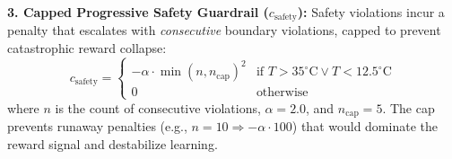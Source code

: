 \documentclass[conference]{IEEEtran}
\begin{document}
    \noindent \textbf{3. Capped Progressive Safety Guardrail ($c_{\text{safety}}$):} Safety violations incur a penalty that escalates with \emph{consecutive} boundary violations, capped to prevent catastrophic reward collapse:
    \begin{equation}
    c_{\text{safety}} = \begin{cases}
    -\alpha \cdot \min(n, n_{\text{cap}})^2 & \text{if } T > 35^{\circ}\text{C} \lor T < 12.5^{\circ}\text{C} \\
    0 & \text{otherwise}
    \end{cases}
    \end{equation}
    \noindent where $n$ is the count of consecutive violations, $\alpha = 2.0$, and $n_{\text{cap}} = 5$.  The cap prevents runaway penalties (e.g., $n = 10 \Rightarrow -\alpha \cdot 100$) that would dominate the reward signal and destabilize learning.
\end{document}
